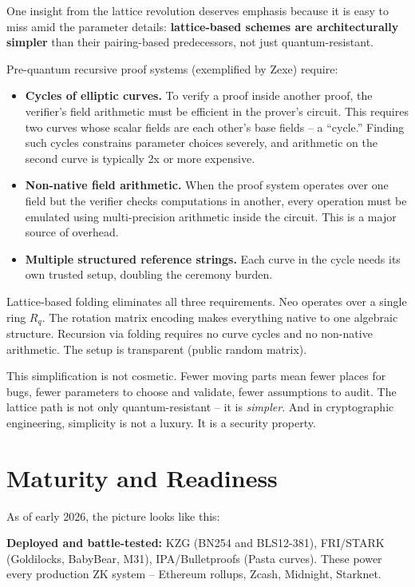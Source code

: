 \documentclass[
  11pt,
  openany]{report}
\renewcommand{\textbf}[1]{{\bfseries\color{MidnightBold}#1}}
\begin{document}
One insight from the lattice revolution deserves emphasis because it is easy to
miss amid the parameter details: \textbf{lattice-based schemes are
architecturally simpler} than their pairing-based predecessors, not just
quantum-resistant.

Pre-quantum recursive proof systems (exemplified by Zexe) require:

\begin{itemize}
\item
  \textbf{Cycles of elliptic curves.} To verify a proof inside another proof,
  the verifier's field arithmetic must be efficient in the prover's circuit.
  This requires two curves whose scalar fields are each other's base fields -- a
  ``cycle.'' Finding such cycles constrains parameter choices severely, and
  arithmetic on the second curve is typically 2x or more expensive.
\item
  \textbf{Non-native field arithmetic.} When the proof system operates over one
  field but the verifier checks computations in another, every operation must be
  emulated using multi-precision arithmetic inside the circuit. This is a major
  source of overhead.
\item
  \textbf{Multiple structured reference strings.} Each curve in the cycle needs
  its own trusted setup, doubling the ceremony burden.
\end{itemize}

Lattice-based folding eliminates all three requirements. Neo operates over a
single ring \(R_q\). The rotation matrix encoding makes everything native to one
algebraic structure. Recursion via folding requires no curve cycles and no
non-native arithmetic. The setup is transparent (public random matrix).

This simplification is not cosmetic. Fewer moving parts mean fewer places for
bugs, fewer parameters to choose and validate, fewer assumptions to audit. The
lattice path is not only quantum-resistant -- it is \emph{simpler}. And in
cryptographic engineering, simplicity is not a luxury. It is a security
property.

\section{Maturity and Readiness}\label{maturity-and-readiness}

As of early 2026, the picture looks like this:

\textbf{Deployed and battle-tested:} KZG (BN254 and BLS12-381), FRI/STARK
(Goldilocks, BabyBear, M31), IPA/Bulletproofs (Pasta curves). These power every
production ZK system -- Ethereum rollups, Zcash, Midnight, Starknet.
\end{document}
